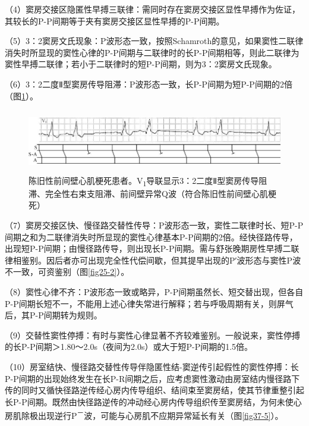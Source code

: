 （4）窦房交接区隐匿性早搏三联律：需同时存在窦房交接区显性早搏作为佐证，其较长的P-P间期等于夹有窦房交接区显性早搏的P-P间期。

（5）3：2窦房文氏现象：P波形态一致，按照Schamroth的意见，如果窦性二联律消失时所显现的窦性心律的P-P间期与二联律时的长P-P间期相等，则此二联律为窦性早搏二联律；若小于二联律时的短P-P间期，则为3：2窦房文氏现象。

（6）3：2二度Ⅱ型窦房传导阻滞：P波形态一致，长P-P间期为短P-P间期的2倍（图\ref{fig37-4}）。

\begin{figure}[!htbp]
 \centering
 \includegraphics[width=5.78125in,height=1.08333in]{./images/Image00598.jpg}
 \captionsetup{justification=centering}
 \caption{陈旧性前间壁心肌梗死患者。V\textsubscript{1}导联显示3：2二度Ⅱ型窦房传导阻滞、完全性右束支阻滞、前间壁异常Q波（符合陈旧性前间壁心肌梗死）}
 \label{fig37-4}
  \end{figure} 


（7）窦房交接区快、慢径路交替性传导：P波形态一致，窦性二联律时长、短P-P间期之和为二联律消失时所显现的窦性心律基本P-P间期的2倍。经快径路传导，出现短P-P间期；由慢径路传导，则出现长P-P间期。需与舒张晚期房性早搏二联律相鉴别。因后者亦可出现完全性代偿间歇，但其提早出现的P′波形态与窦性P波不一致，可资鉴别（图\ref{fig25-2}）。

（8）窦性心律不齐：P波形态一致或略异，P-P间期虽然长、短交替出现，但各自P-P间期长短不一，不能用上述心律失常进行解释；若与呼吸周期有关，则屏气后，其P-P间期转为规则。

（9）交替性窦性停搏：有时与窦性心律显著不齐较难鉴别。一般说来，窦性停搏的长P-P间期＞1.80～2.0s（夜间为2.0s）或大于短P-P间期的1.5倍。

（10）房室结快、慢径路交替性传导伴隐匿性结-窦逆传引起假性的窦性停搏：长P-P间期的出现始终发生在长P-R间期之后，应考虑窦性激动由房室结内慢径路下传的同时又循快径路逆传经心房内传导组织、结间束至窦房结，使其节律重整引起长P-P间期。既然由快径路逆传的冲动经心房内传导组织传至窦房结，为何未使心房肌除极出现逆行P\textsuperscript{－}波，可能与心房肌不应期异常延长有关（图\ref{fig37-5}）。

